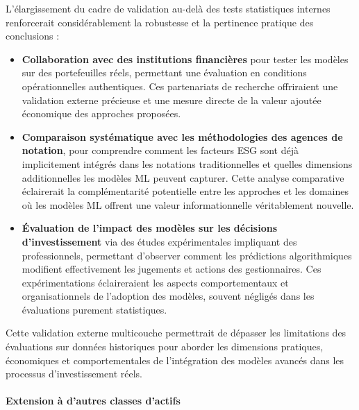 L'élargissement du cadre de validation au-delà des tests statistiques internes renforcerait considérablement la robustesse et la pertinence pratique des conclusions :
\begin{itemize}
    \item \textbf{Collaboration avec des institutions financières} pour tester les modèles sur des portefeuilles réels, permettant une évaluation en conditions opérationnelles authentiques. Ces partenariats de recherche offriraient une validation externe précieuse et une mesure directe de la valeur ajoutée économique des approches proposées.
    
    \item \textbf{Comparaison systématique avec les méthodologies des agences de notation}, pour comprendre comment les facteurs ESG sont déjà implicitement intégrés dans les notations traditionnelles et quelles dimensions additionnelles les modèles ML peuvent capturer. Cette analyse comparative éclairerait la complémentarité potentielle entre les approches et les domaines où les modèles ML offrent une valeur informationnelle véritablement nouvelle.
    
    \item \textbf{Évaluation de l'impact des modèles sur les décisions d'investissement} via des études expérimentales impliquant des professionnels, permettant d'observer comment les prédictions algorithmiques modifient effectivement les jugements et actions des gestionnaires. Ces expérimentations éclaireraient les aspects comportementaux et organisationnels de l'adoption des modèles, souvent négligés dans les évaluations purement statistiques.
\end{itemize}

Cette validation externe multicouche permettrait de dépasser les limitations des évaluations sur données historiques pour aborder les dimensions pratiques, économiques et comportementales de l'intégration des modèles avancés dans les processus d'investissement réels.

\paragraph{Extension à d'autres classes d'actifs} 

